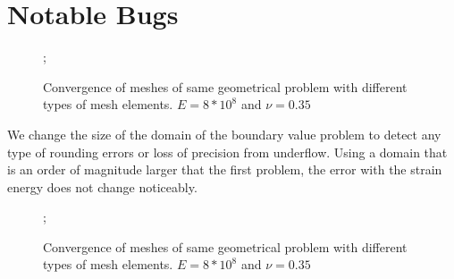 \documentclass{article}
\begin{document}
\FloatBarrier

\section{Notable Bugs}

\FloatBarrier

\begin{figure}
    ;
    \caption{Convergence of meshes of same geometrical problem with different types of mesh elements. $E = 8*10^8$ and $\nu = 0.35$}
\centering
\end{figure}
We change the size of the domain of the boundary value problem to detect any type of rounding errors or loss of precision from underflow. Using a domain that is an order of magnitude larger that the first problem, the error with the strain energy does not change noticeably.
\begin{figure}
    ;
    \caption{Convergence of meshes of same geometrical problem with different types of mesh elements. $E = 8*10^8$ and $\nu = 0.35$}
\centering
\end{figure}
\end{document}
